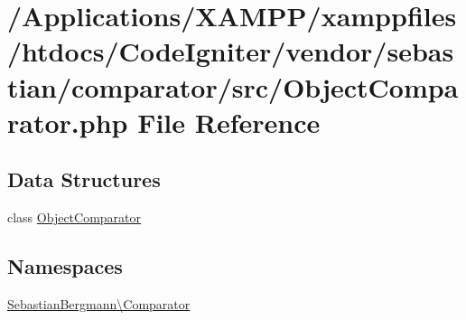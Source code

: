 \hypertarget{_object_comparator_8php}{}\section{/\+Applications/\+X\+A\+M\+P\+P/xamppfiles/htdocs/\+Code\+Igniter/vendor/sebastian/comparator/src/\+Object\+Comparator.php File Reference}
\label{_object_comparator_8php}
\subsection*{Data Structures}
\begin{DoxyCompactItemize}
\item 
class \mbox{\hyperlink{class_sebastian_bergmann_1_1_comparator_1_1_object_comparator}{Object\+Comparator}}
\end{DoxyCompactItemize}
\subsection*{Namespaces}
\begin{DoxyCompactItemize}
\item 
 \mbox{\hyperlink{namespace_sebastian_bergmann_1_1_comparator}{Sebastian\+Bergmann\textbackslash{}\+Comparator}}
\end{DoxyCompactItemize}
